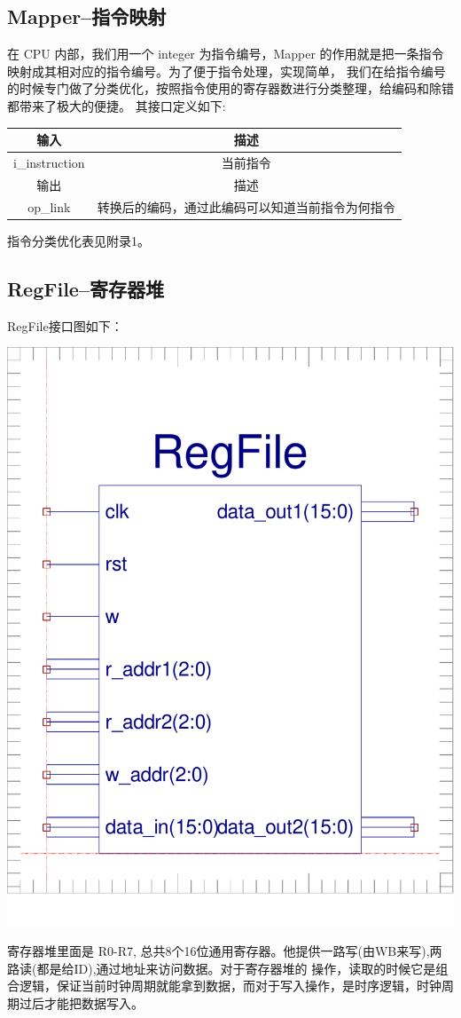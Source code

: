 \documentclass[10pt]{article}
\begin{document}
\begin{CJK}{UTF8}{gbsn}
\subsection{Mapper--指令映射}
在 CPU 内部，我们用一个 integer 为指令编号，Mapper 的作用就是把一条指令映射成其相对应的指令编号。为了便于指令处理，实现简单，
我们在给指令编号的时候专门做了分类优化，按照指令使用的寄存器数进行分类整理，给编码和除错都带来了极大的便捷。
其接口定义如下:\\
\begin{center}
\begin{tabular}{|c|c|}\hline
输入&描述\\\hline
i\_instruction&当前指令\\\hline\hline
输出&描述\\\hline
op\_link&转换后的编码，通过此编码可以知道当前指令为何指令\\\hline
\end{tabular}
\end{center}

指令分类优化表见附录1。

\subsection{RegFile--寄存器堆}
RegFile接口图如下：\\
\begin{center}
\includegraphics[width=0.5\linewidth]{regfile.pdf}
\end{center}

寄存器堆里面是 R0-R7, 总共8个16位通用寄存器。他提供一路写(由WB来写),两路读(都是给ID),通过地址来访问数据。对于寄存器堆的
操作，读取的时候它是组合逻辑，保证当前时钟周期就能拿到数据，而对于写入操作，是时序逻辑，时钟周期过后才能把数据写入。


\end{CJK}
\end{document}
